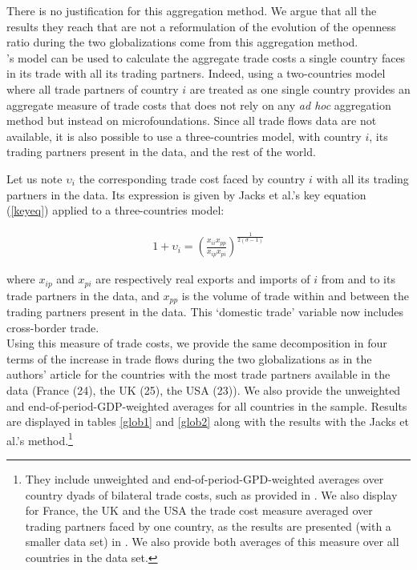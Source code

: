 \documentclass{article}
\begin{document}
There is no justification for this aggregation method. We argue that
all the results they reach that are not a reformulation of the
evolution of the openness ratio during the two
globalizations come from this aggregation method.\\

\cite{AW2003}'s model can be used to calculate the aggregate
trade costs a single country faces in its trade with all
its trading partners. Indeed, using a two-countries model where
all trade partners of country $i$ are treated as one single
country provides an aggregate measure of trade costs that does
not rely on any \textit{ad hoc} aggregation method but instead on
microfoundations. Since all trade flows data are not available,
it is also possible to use a three-countries model, with
country $i$, its trading partners present in the data, and the
rest of the world.

Let us note $\upsilon_{i}$ the corresponding trade cost faced
by country $i$ with all its trading partners in the data. Its
expression is given by Jacks et al.'s key equation
(\ref{keyeq}) applied to a three-countries model:

\begin{eqnarray}
1+\upsilon_{i}=\left(\frac{x_{ii} x_{pp}}{x_{ip}
x_{pi}}\right)^{\frac{1}{2(\sigma-1)}} \label{keyeq3model}
\end{eqnarray}

where $x_{ip}$ and $x_{pi}$ are respectively real exports and
imports of $i$ from and to its trade partners in the data, and
$x_{pp}$ is the volume of trade within and between the trading
partners present in the data. This `domestic trade' variable
now
includes cross-border trade.\\

Using this measure of trade costs, we provide the same
decomposition in four terms of the increase in trade flows
during the two globalizations as in the authors' article for
the countries with the most trade partners available in the
data (France (24), the UK (25), the USA (23)). We also provide
the unweighted and end-of-period-GDP-weighted averages for all
countries in the sample. Results are displayed in tables
\ref{glob1} and \ref{glob2} along with the results with the
Jacks et al.'s method.\footnote{They include unweighted and
end-of-period-GPD-weighted averages over country dyads of
bilateral trade costs, such as provided in \cite{JMN2011}. We
also display for France, the UK and the USA the trade cost
measure averaged over trading partners faced by one country, as
the results are presented (with a smaller data set) in
\cite{JMN2008, JMN2010}. We also provide both averages of this
measure over all countries in the data set.}\\
\end{document}
